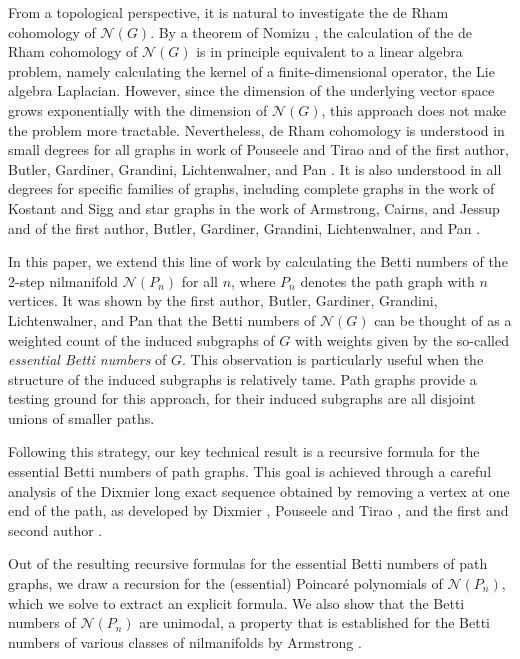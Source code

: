 \documentclass[12pt]{amsart}
\theoremstyle{definition}
\begin{document}
From a topological perspective, it is natural to investigate the de Rham cohomology of $\mathcal N(G)$. By a theorem of Nomizu \cite{Nomizu54}, the calculation of the de Rham cohomology of $\mathcal N(G)$ is in principle equivalent to a linear algebra problem, namely calculating the kernel of a finite-dimensional operator, the Lie algebra Laplacian. However, since the dimension of the underlying vector space grows exponentially with the dimension of $\mathcal N(G)$, this approach does not make the problem more tractable. Nevertheless, de Rham cohomology is understood in small degrees for all graphs in work of Pouseele and Tirao \cite{PouseeleTirao09} and of the first author, Butler, Gardiner, Grandini, Lichtenwalner, and Pan \cite{ABGGLP}. It is also understood in all degrees for specific families of graphs, including complete graphs in the work of Kostant \cite{Kostant61} and Sigg \cite{Sigg96} and star graphs in the work of Armstrong, Cairns, and Jessup \cite{ArmstrongCairnsJessup97} and of the first author, Butler, Gardiner, Grandini, Lichtenwalner, and Pan \cite{ABGGLP}.

In this paper, we extend this line of work by calculating the Betti numbers of the 2-step nilmanifold $\mathcal N(P_n)$ for all $n$, where $P_n$ denotes the path graph with $n$ vertices. It was shown by the first author, Butler, Gardiner, Grandini, Lichtenwalner, and Pan \cite{ABGGLP} that the Betti numbers of $\mathcal N(G)$ can be thought of as a weighted count of the induced subgraphs of $G$ with weights given by the so-called \emph{essential Betti numbers} of $G$. This observation is particularly useful when the structure of the induced subgraphs is relatively tame. Path graphs provide a testing ground for this approach, for their induced subgraphs are all disjoint unions of smaller paths.

Following this strategy, our key technical result is a recursive formula for the essential Betti numbers of path graphs. This goal is achieved through a careful analysis of the Dixmier long exact sequence obtained by removing a vertex at one end of the path, as developed by Dixmier \cite{Dixmier55}, Pouseele and Tirao \cite{PouseeleTirao09}, and the first and second author \cite{AldiBevins24}.

Out of the resulting recursive formulas for the essential Betti numbers of path graphs, we draw a recursion for the (essential) Poincar\'e polynomials of $\mathcal N(P_n)$, which we solve to extract an explicit formula. We also show that the Betti numbers of $\mathcal N(P_n)$ are unimodal, a property that is established for the Betti numbers of various classes of nilmanifolds by Armstrong \cite{Armstrong97}.
\end{document}
